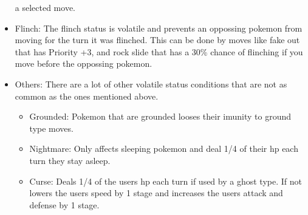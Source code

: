 \begin{itemize}
    a selected move.
  \item Flinch: The flinch status is volatile and prevents an oppossing pokemon from moving for the turn it was flinched. This can be done by moves like 
    fake out that has Priority +3, and rock slide that has a 30\% chance of flinching if you move before the oppossing pokemon.
  \item Others: There are a lot of other volatile status conditions that are not as common as the ones mentioned above.
  \begin{itemize}
    \item Grounded: Pokemon that are grounded looses their imunity to ground type moves.
    \item Nightmare: Only affects sleeping pokemon and deal 1/4 of their hp each turn they stay asleep.
    \item Curse: Deals 1/4 of the users hp each turn if used by a ghost type. If not lowers the users speed by 1 stage and increases 
      the users attack and defense by 1 stage.
  \end{itemize}
\end{itemize}
